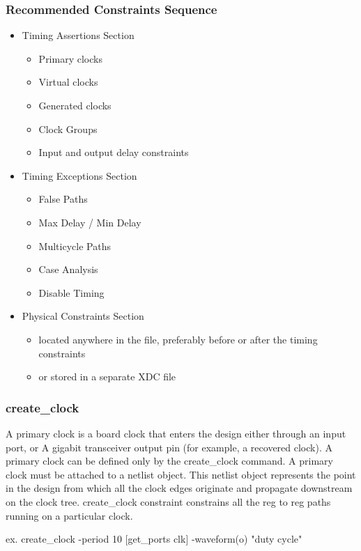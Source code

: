 \subsubsection{Recommended Constraints Sequence}
\begin{itemize}
    \item Timing Assertions Section
    \begin{itemize}
        \item Primary clocks
        \item Virtual clocks
        \item Generated clocks
        \item Clock Groups
        \item Input and output delay constraints
    \end{itemize}
    \item Timing Exceptions Section
    \begin{itemize}
        \item False Paths
        \item Max Delay / Min Delay
        \item Multicycle Paths
        \item Case Analysis
        \item Disable Timing
    \end{itemize}
    \item Physical Constraints Section
    \begin{itemize}
        \item located anywhere in the file, preferably before or after the timing constraints
        \item or stored in a separate XDC file 
    \end{itemize}
\end{itemize}

\subsubsection{create\_clock} 
A primary clock is a board clock that enters the design either through an input port, or A gigabit transceiver output pin (for example, a recovered clock). A primary clock can be defined only by the create\_clock command. A primary clock must be attached to a netlist object. This netlist object represents the point in the design from which all the clock edges originate and propagate downstream on the clock tree. create\_clock constraint constrains all the reg to reg paths running on a particular clock.\\
\centerline{ex. create\_clock -period 10 [get\_ports clk] -waveform(o) "duty cycle"}

